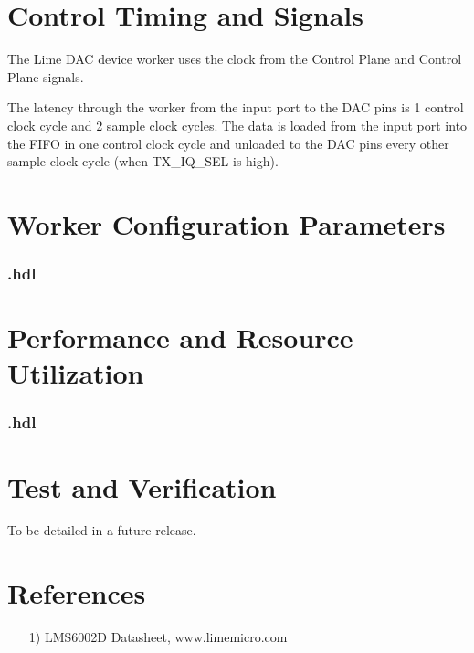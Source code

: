 		\section*{Control Timing and Signals}
		The Lime DAC device worker uses the clock from the Control Plane and Control Plane signals.\par\bigskip
		\noindent The latency through the worker from the input port to the DAC pins is 1 control clock cycle and 2 sample clock cycles. The data is loaded from the input port into the FIFO in one control clock cycle and unloaded to the DAC pins every other sample clock cycle (when TX\_IQ\_SEL is high).

\begin{landscape}
\section*{Worker Configuration Parameters}
\subsubsection*{\comp.hdl}
%
\section*{Performance and Resource Utilization}
\subsubsection*{\comp.hdl}
%
\end{landscape}
	\section*{Test and Verification}
	\begin{flushleft}
	 To be detailed in a future release.
	\end{flushleft}
	\section*{References}
	\begin{flushleft}
		\begin{itemize}
			\item[1)] LMS6002D Datasheet, www.limemicro.com
		\end{itemize}
	\end{flushleft}


